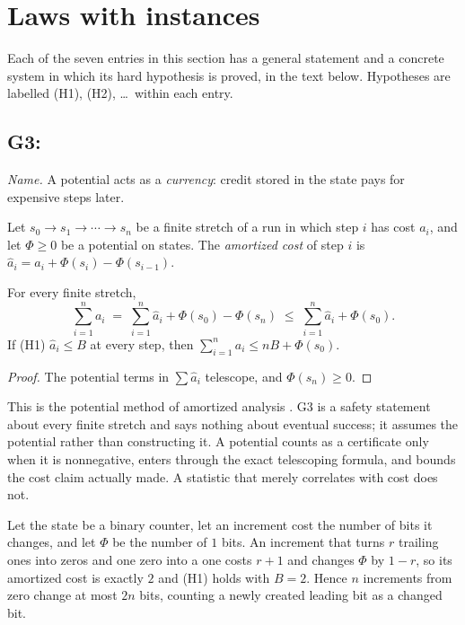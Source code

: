 \section{Laws with instances}\label{sec:laws}

Each of the seven entries in this section has a general statement and a concrete system in which
its hard hypothesis is proved, in the text below. Hypotheses are labelled (H1), (H2), \dots\ within
each entry.

\subsection{G3: \lawGThree}\label{sec:G3}

\emph{Name.} A potential acts as a \emph{currency}: credit stored in the state pays for expensive
steps later.

Let $s_0 \to s_1 \to \cdots \to s_n$ be a finite stretch of a run in which step $i$ has cost
$a_i$, and let $\Phi \ge 0$ be a potential on states. The \emph{amortized cost} of step $i$ is
$\widehat a_i = a_i + \Phi(s_i) - \Phi(s_{i-1})$.

\begin{theorem}\label{thm:G3}
For every finite stretch,
\[
  \sum_{i=1}^{n} a_i \;=\; \sum_{i=1}^{n} \widehat a_i + \Phi(s_0) - \Phi(s_n)
  \;\le\; \sum_{i=1}^{n} \widehat a_i + \Phi(s_0).
\]
If \textup{(H1)} $\widehat a_i \le B$ at every step, then $\sum_{i=1}^n a_i \le nB + \Phi(s_0)$.
\end{theorem}

\begin{proof}
The potential terms in $\sum \widehat a_i$ telescope, and $\Phi(s_n) \ge 0$.
\end{proof}

This is the potential method of amortized analysis \citep{Tarjan1985,CormenEtAl}. G3 is a safety
statement about every finite stretch and says nothing about eventual success; it assumes the
potential rather than constructing it. A potential counts as a certificate only when it is
nonnegative, enters through the exact telescoping formula, and bounds the cost claim actually made.
A statistic that merely correlates with cost does not.

\begin{example}\label{ex:G3-counter}
Let the state be a binary counter, let an increment cost the number of bits it changes, and let
$\Phi$ be the number of $1$ bits. An increment that turns $r$ trailing ones into zeros and one zero
into a one costs $r + 1$ and changes $\Phi$ by $1 - r$, so its amortized cost is exactly $2$ and
\textup{(H1)} holds with $B = 2$. Hence $n$ increments from zero change at most $2n$ bits, counting a
newly created leading bit as a changed bit.
\end{example}

